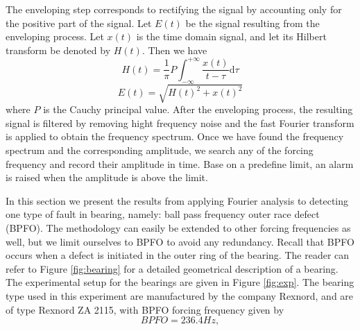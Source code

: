 \documentclass[../Main/thesis.tex]{subfiles}
\begin{document}
\justify
The enveloping step corresponds to rectifying the signal by accounting only for the positive part of the signal. Let $E(t)$ be the signal resulting from the enveloping process. Let $x(t)$ is the time domain signal, and let its Hilbert transform be denoted by $H(t)$. Then we have
\begin{equation}
H(t) = \frac{1}{\pi}P\int_{-\infty}^{+\infty}\frac{x(t)}{t-\tau}\mathrm{d}\tau
\end{equation}
\begin{equation}
E(t) = \sqrt{H(t)^{2}+ x(t)^{2}}
\end{equation}
where $P$ is the Cauchy principal value. After the enveloping process, the resulting signal is filtered by removing hight frequency noise and the fast Fourier transform is applied to obtain the frequency spectrum.
\justify
Once we have found the frequency spectrum and the corresponding amplitude, we search any of the forcing frequency and record their amplitude in time. Base on a predefine limit, an alarm is raised when the amplitude is above the limit.



\clearpage
In this section we present the results from applying Fourier analysis to detecting one type of fault in bearing, namely: ball pass frequency outer race defect (BPFO). The methodology can easily be extended to other forcing frequencies as well, but we limit ourselves to BPFO to avoid any redundancy. Recall that BPFO occurs when a defect is initiated in the outer ring of the bearing. The reader can refer to Figure \ref{fig:bearing} for a detailed geometrical description of a bearing. The experimental setup for the bearings are given in Figure \ref{fig:exp}. The bearing type used in this experiment are manufactured by the company Rexnord, and are of type Rexnord ZA 2115, with BPFO forcing frequency  given by 
\begin{equation}
BPFO = 236.4 Hz, %
\end{equation}

\end{document}
